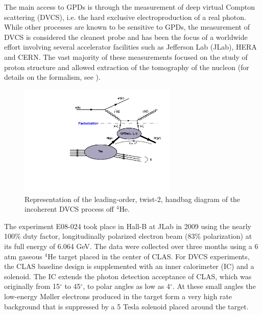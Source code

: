 \documentclass[twocolumn,nofootinbib,showpacs,prl,superscriptaddress,secnumarabic,amssymb,nobibnotes,aps,floatfix]{revtex4}
\begin{document}
\maketitle 

The main access to GPDs is through the measurement of deep virtual Compton 
scattering (DVCS), i.e. the hard exclusive electroproduction of a real photon.  
While other processes are known to be sensitive to GPDs, the measurement of
DVCS is considered the cleanest probe and has been the focus of a worldwide effort 
\cite{Stepanyan:2001sm,Airapetian,Chekanov:2003ya,Aktas:2005ty,Chen:2006na,Munoz 
Camacho:2006hx,Girod:2007aa,Mazouz:2007aa,Gavalian:2009,Seder:2015,Pisano:2015,Jo:2015ema}
involving several accelerator facilities such as Jefferson Lab (JLab), HERA and  
CERN. The vast majority of these measurements focused on the study of proton 
structure and allowed extraction of the tomography of the nucleon (for details 
on the formalism, see 
\cite{Goeke:2001tz,Diehl:2003ny,Ji:2004gf,Belitsky:2005qn,Boffi:2007yc,Guidal:2013rya}).

\begin{figure}[tb]
\includegraphics[width=7.5cm]{figs/handbag_incoherent.pdf}
\caption{Representation of the leading-order, twist-2, handbag diagram of the 
incoherent DVCS process off $^4$He.}
\label{fig:diags}
\end{figure}


The experiment E08-024 took place in Hall-B at JLab
in 2009 using the nearly 100\% duty factor, longitudinally 
polarized electron beam (83$\%$ polarization) at its full energy of 6.064 
GeV. The data were collected over three months using a 6 atm gaseous $^4$He 
target placed in the center of CLAS. For DVCS experiments, the CLAS baseline 
design \cite{Mecking:2003zu} is supplemented with an inner calorimeter (IC) and 
a solenoid. The IC extends the photon detection acceptance of CLAS, which was 
originally from 15$^{\circ}$ to 45$^{\circ}$, to polar angles as low as 
4$^{\circ}$. At these small angles the low-energy M\o{}ller electrons produced 
in the target form a very high rate background that is
suppressed by a 5 Tesla solenoid placed around the target. 
\end{document}
